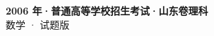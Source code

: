 \documentclass[zihao=-4, a4paper]{ctexart}
\begin{document}
\begin{center}
  {\Large\bfseries 2006 年·普通高等学校招生考试·山东卷理科}\\[4pt]
  {\large 数学 · 试题版}
\end{center}
\medskip
{}

\end{document}
